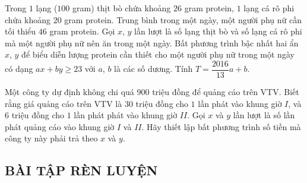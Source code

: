 \begin{vd}%
	Trong $1$ lạng ($100$ gram) thịt bò chứa khoảng $26$ gram protein, $1$ lạng cá rô phi chứa khoảng $20$ gram protein. Trung bình trong một ngày, một người phụ nữ cần tối thiểu $46$ gram protein. Gọi $x$, $y$ lần lượt là số lạng thịt bò và số lạng cá rô phi mà một người phụ nữ nên ăn trong một ngày. Bất phương trình bậc nhất hai ẩn $x$, $y$ để biểu diễn lượng protein cần thiết cho một người phụ nữ trong một ngày có dạng $ax+by\geq 23$ với $a$, $b$ là các số dương. Tính $T=\dfrac{2016}{13}a+b$.
\end{vd}
\begin{vd}%
	Một công ty dự định không chi quá $900$ triệu đồng để quảng cáo trên VTV. Biết rằng giá quảng cáo trên VTV là $30$ triệu đồng cho $1$ lần phát vào khung giờ $I$, và $6$ triệu đồng cho $1$ lần phát phát vào khung giờ $II$. Gọi $x$ và $y$ lần lượt là số lần phát quảng cáo vào khung giờ $I$ và $II$. Hãy thiết lập bất phương trình số tiền mà công ty này phải trả theo $x$ và $y$.
\end{vd}

\subsection{BÀI TẬP RÈN LUYỆN}
\baitaptl

